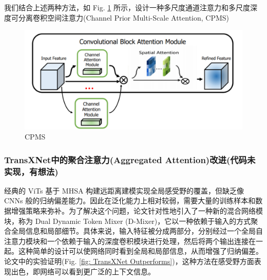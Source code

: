 \documentclass[a4paper]{ctexart}
\begin{document}
		我们结合上述两种方法，如 Fig. \ref{fig: CPMS} 所示，设计一种多尺度通道注意力和多尺度深度可分离卷积空间注意力(Channel Prior Multi-Scale Attention, CPMS)
		
		\begin{figure}[htbp]
			\centering
			\includegraphics[width=0.8\linewidth]{picture/LLIE/Experiment/CPMS}
			\caption{CPMS}
			\label{fig: CPMS}
		\end{figure}
		
		\subsubsection*{TransXNet中的聚合注意力(Aggregated Attention)改进(代码未实现，有想法)}
		
		经典的 ViTs 基于 MHSA 构建远距离建模实现全局感受野的覆盖，但缺乏像 CNNs 般的归纳偏差能力。因此在泛化能力上相对较弱，需要大量的训练样本和数据增强策略来弥补。为了解决这个问题，论文\cite{lou2023transxnet}针对性地引入了一种新的混合网络模块，称为 Dual Dynamic Token Mixer (D-Mixer)，它以一种依赖于输入的方式聚合全局信息和局部细节。具体来说，输入特征被分成两部分，分别经过一个全局自注意力模块和一个依赖于输入的深度卷积模块进行处理，然后将两个输出连接在一起。这种简单的设计可以使网络同时看到全局和局部信息，从而增强了归纳偏差。论文中的实验证明(Fig. \ref{fig: TransXNet Outperforms})，这种方法在感受野方面表现出色，即网络可以看到更广泛的上下文信息。
		
\end{document}
